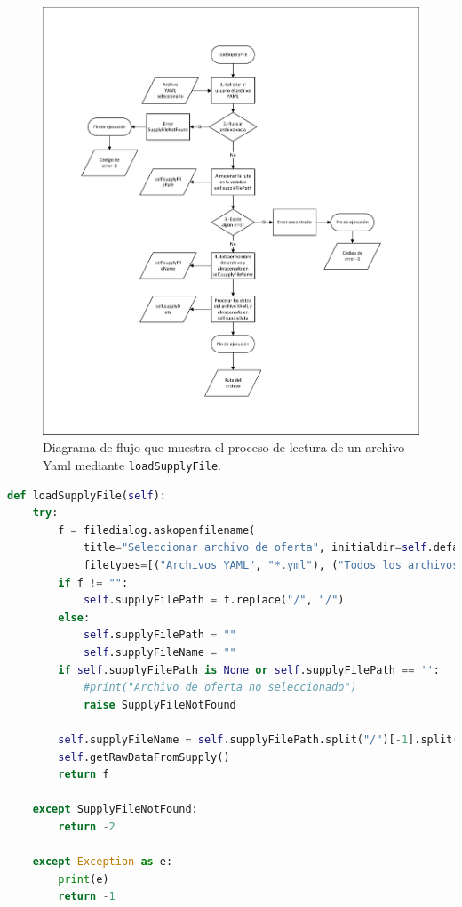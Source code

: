 \begin{figure}[H]
\centering
\includegraphics[width=.92\textwidth]{fig/Diagramas de flujo/loadSupplyFile.pdf}
\caption{Diagrama de flujo que muestra el proceso de lectura de un archivo \acrshort{Yaml} mediante \texttt{loadSupplyFile}.}
\label{fig:DiagramaFlujoLoadSupplyFile}
\end{figure}

\begin{lstlisting}[language=Python,
                   style=python,
                   frame=none,
                   numbers=none,
                   basicstyle=\ttfamily\normalsize,
                   caption={Función \texttt{loadSupplyFile}},
                   label=src:functionLoadSupplyFile,
                   inputencoding=utf8]                   
def loadSupplyFile(self):
    try:
        f = filedialog.askopenfilename(
            title="Seleccionar archivo de oferta", initialdir=self.defaultInputDataFolder,
            filetypes=[("Archivos YAML", "*.yml"), ("Todos los archivos", "*.*")], defaultextension=".yml")
        if f != "":
            self.supplyFilePath = f.replace("/", "/")
        else:
            self.supplyFilePath = ""
            self.supplyFileName = ""
        if self.supplyFilePath is None or self.supplyFilePath == '':
            #print("Archivo de oferta no seleccionado")
            raise SupplyFileNotFound

        self.supplyFileName = self.supplyFilePath.split("/")[-1].split(".")[0]
        self.getRawDataFromSupply()
        return f

    except SupplyFileNotFound:
        return -2

    except Exception as e:
        print(e)
        return -1
\end{lstlisting}

